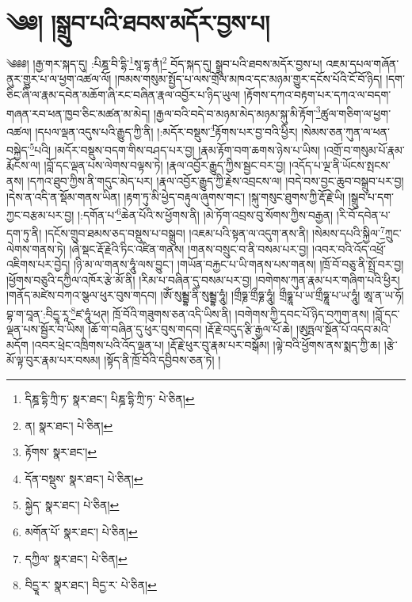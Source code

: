 \setcounter{footnote}{0} 
\chapter{༄༅། །སྒྲུབ་པའི་ཐབས་མདོར་བྱས་པ།}༄༅༅། །རྒྱ་གར་སྐད་དུ། :པིཎྜ་བི་དྷི་\footnote{དིཎྜ་དྷི་ཀྲི་ཏ་  སྣར་ཐང་། པིཎྜ་དྷི་ཀྲི་ཏ་  པེ་ཅིན། }སཱ་དྷ་ནཾ།\footnote{ན།  སྣར་ཐང་།  པེ་ཅིན། } བོད་སྐད་དུ། སྒྲུབ་པའི་ཐབས་མདོར་བྱས་པ། འཇམ་དཔལ་གཞོན་ནུར་གྱུར་པ་ལ་ཕྱག་འཚལ་ལོ། །ཁམས་གསུམ་སྤྱོད་པ་ལས་གྲོལ་མཁའ་དང་མཉམ་གྱུར་དངོས་པོའི་ངོ་བོ་ཉིད། །དག་ཅིང་ཞི་ལ་རྣམ་དབེན་མཆོག་ཞི་རང་བཞིན་རྣལ་འབྱོར་པ་ཉིད་ཡུལ། །རྟོགས་དཀའ་བརྟག་པར་དཀའ་ལ་བདག་གཞན་རབ་ཕན་ཁྱབ་ཅིང་མཚན་མ་མེད། །རྒྱལ་བའི་བདེ་བ་མཉམ་མེད་མཉམ་སྐུ་མི་རྟོག་\footnote{རྟོགས་  སྣར་ཐང་། }ཚུལ་གཅིག་ལ་ཕྱག་འཚལ། །དཔལ་ལྡན་འདུས་པའི་རྒྱུད་ཀྱི་ནི། །:མདོར་བསྡུས་\footnote{དོན་བསྡུས་  སྣར་ཐང་།  པེ་ཅིན། }རྟོགས་པར་བྱ་བའི་ཕྱིར། །སེམས་ཅན་ཀུན་ལ་ཕན་བསྐྱེད་\footnote{སྐྱེད་  སྣར་ཐང་།  པེ་ཅིན། }པའི། །མདོར་བསྡུས་བདག་གིས་བཤད་པར་བྱ། །རྣམ་རྟོག་བག་ཆགས་ཉེས་པ་ཡིས། །འགྲོ་བ་གསུམ་པོ་རྣམ་རྨོངས་ལ། །བློ་དང་ལྡན་པས་ལེགས་བལྟས་ཏེ། །རྣལ་འབྱོར་རྒྱུད་ཀྱིས་སྦྱང་བར་བྱ། །འདོད་པ་ལྔ་ནི་ཡོངས་སྤངས་ནས། །དཀའ་ཐུབ་ཀྱིས་ནི་གདུང་མེད་པར། །རྣལ་འབྱོར་རྒྱུད་ཀྱི་རྗེས་འབྲངས་ལ། །བདེ་བས་བྱང་ཆུབ་བསྒྲུབ་པར་བྱ། །དེས་ན་འདི་ན་སྡོམ་གནས་ཡིན། །རྟག་ཏུ་མི་ཕྱེད་བརྟུལ་ཞུགས་གང་། །སྐུ་གསུང་ཐུགས་ཀྱི་རྡོ་རྗེ་ཡི། །སྒྲུབ་པ་དག་ཀྱང་བརྩམ་པར་བྱ། །:དགོན་པ་\footnote{མགོན་པོ་  སྣར་ཐང་།  པེ་ཅིན། }ཆེན་པོའི་ས་ཕྱོགས་ནི། །མེ་ཏོག་འབྲས་བུ་སོགས་ཀྱིས་བརྒྱན། །རི་བོ་དབེན་པ་དག་ཏུ་ནི། །དངོས་གྲུབ་ཐམས་ཅད་བསྡུས་པ་བསྒྲུབ། །འཇམ་པའི་སྟན་ལ་འདུག་ནས་ནི། །སེམས་དཔའི་སྐྱིལ་\footnote{དཀྱིལ་  སྣར་ཐང་།  པེ་ཅིན། }ཀྲུང་ལེགས་གནས་ཏེ། །ཞེ་སྡང་རྡོ་རྗེའི་ཏིང་འཛིན་གནས། །གནས་བསྲུང་བ་ནི་བསམ་པར་བྱ། །འབར་བའི་འོད་འཕྲོ་འཇིགས་པར་བྱེད། །ཉི་མ་ལ་གནས་ཧཱུཾ་ལས་བྱུང་། །གཡོན་བརྐྱང་པ་ཡི་གནས་པས་གནས། །ཁྲོ་བོ་བཅུ་ནི་སྤྲོ་བར་བྱ། །ཕྱོགས་བཅུའི་དཀྱིལ་འཁོར་རྩེ་མོ་ནི། །རིམ་པ་བཞིན་དུ་བསམ་པར་བྱ། །བགེགས་ཀུན་རྣམ་པར་གཞིག་པའི་ཕྱིར། །གནོད་མཛེས་བཀའ་སྩལ་ཕུར་བུས་གདབ། །ཨོཾ་སུམྦྷ་ནི་སུམྦྷ་ཧཱུཾ། །གྲྀཧྞ་གྲྀཧྞ་ཧཱུཾ། གྲྀཧྞཱ་པ་ཡ་གྲྀཧྞཱ་པ་ཡ་ཧཱུཾ། ཨཱ་ན་ཡ་ཧོ། བྷ་ག་བཱན་:བིདྱཱ་རཱ་\footnote{བིདྱཱ་ར་  སྣར་ཐང་། བིདྱ་ར་  པེ་ཅིན། }ཛ་ཧཱུཾ་ཕཊ། ཁྲོ་བོའི་གཟུགས་ཅན་འདི་ཡིས་ནི། །བགེགས་ཀྱི་དབང་པོ་ཉིད་བཀུག་ནས། །བློ་དང་ལྡན་པས་སྦྱོར་བ་ཡིས། །ཆོ་ག་བཞིན་དུ་ཕུར་བུས་གདབ། །རྡོ་རྗེ་བདུད་རྩི་རྒྱལ་པོ་ཆེ། །ཨུཏྤལ་སྔོན་པོ་འདབ་མའི་མདོག །འབར་ཕྲེང་འཁྲིགས་པའི་འོད་ལྡན་པ། །རྡོ་རྗེ་ཕུར་བུ་རྣམ་པར་བསྒོམ། །ལྟེ་བའི་ཕྱོགས་ནས་སྨད་ཀྱི་ཆ། །རྩེ་མོ་ལྟ་བུར་རྣམ་པར་བསམ། །སྟོད་ནི་ཁྲོ་བོའི་དབྱིབས་ཅན་ཏེ། །
